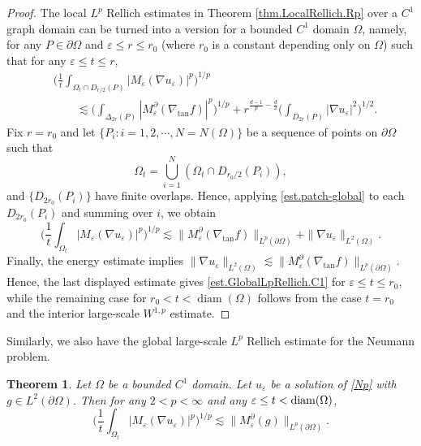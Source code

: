 \documentclass[reqno,12pt]{amsart} %
\newtheorem{theorem}{Theorem}[section]
\theoremstyle{definition}
\theoremstyle{remark}
\numberwithin{equation}{section}
\newcommand{\e}{\varepsilon}
\DeclareMathOperator{\diam}{diam}
\begin{document}
\begin{proof}
    The local $L^p$ Rellich estimates in Theorem \ref{thm.LocalRellich.Rp} over a $C^1$ graph domain can be turned into a version for a bounded  $C^1$ domain $\Omega$, namely, for any $P\in \partial \Omega$ and $\e \le r \le r_0$ (where $r_0$ is a constant depending only on $\Omega$) such that for any $\e \le t \le r$,
    \begin{equation}\label{est.patch-global}
    \begin{aligned}
        & \bigg( \frac{1}{t} \int_{\Omega_t \cap D_{r/2}(P)} |M_\e(\nabla u_\e)|^p \bigg)^{1/p} \\
        & \qquad \lesssim \bigg( \int_{\Delta_{2r}(P)} |M_\e^\partial (\nabla_{\tan} f)|^p \bigg)^{1/p} + r^{\frac{d-1}{p} - \frac{d}{2}} \bigg( \int_{D_{2r}(P)} |\nabla u_\e|^2 \bigg)^{1/2}.
    \end{aligned}
    \end{equation}
    Fix $r = r_0$ and let $\{ P_i: i = 1,2,\cdots, N = N(\Omega) \}$ be a sequence of points on $\partial \Omega$ such that
    \begin{equation}
        \Omega_t = \bigcup_{i=1}^{N} ( \Omega_t \cap D_{r_0/2}(P_i) ),
    \end{equation}
    and $\{ D_{2r_0}(P_i) \}$ have finite overlaps. Hence, applying \eqref{est.patch-global} to each $D_{2r_0}(P_i)$ and summing over $i$, we obtain
    \begin{equation}
        \bigg( \frac{1}{t} \int_{\Omega_t} |M_\e(\nabla u_\e)|^p \bigg)^{1/p} \lesssim \| M_\e^\partial (\nabla_{\tan} f) \|_{L^p(\partial \Omega)} + \| \nabla u_\e \|_{L^2(\Omega)}.
    \end{equation}
    Finally, the energy estimate implies $\| \nabla u_\e \|_{L^2(\Omega)} \lesssim \| M_\e^\partial (\nabla_{\tan} f) \|_{L^p(\partial \Omega)}$. Hence, the last displayed estimate gives \eqref{est.GlobalLpRellich.C1} for $\e \le t\le r_0$, while the remaining case for $r_0 < t< \diam(\Omega)$ follows from the case $t = r_0$ and the interior large-scale $W^{1,p}$ estimate.
\end{proof}

Similarly, we also have the global large-scale $L^p$ Rellich estimate for the Neumann problem.
\begin{theorem}\label{thm.C1Rellich.Np}
Let $\Omega$ be a bounded $C^1$ domain.
Let $u_\e$ be a solution of \eqref{Np} with $g\in L^2(\partial \Omega)$. Then for any $2<p<\infty$ and
 any $\e \le t < {\rm diam}(\Omega)$,
    \begin{equation}%
        \bigg( \frac{1}{t} \int_{\Omega_t} |M_\e(\nabla u_\e)|^p \bigg)^{1/p} \lesssim \| M_\e^\partial(g) \|_{L^p(\partial \Omega)}.
    \end{equation}
\end{theorem}
\end{document}

